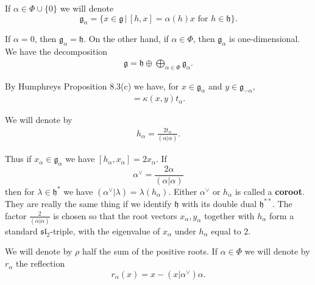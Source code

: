 \documentclass[12pt]{article}
\begin{document}
If $\alpha \in \Phi \cup \{0\}$ we will denote
\[
    \mathfrak{g}_\alpha = \{x \in \mathfrak{g} \,|\, [h,x] = \alpha(h)x \text{ for } h \in \mathfrak{h} \}.
\]

If $\alpha = 0$, then $\mathfrak{g}_\alpha = \mathfrak{h}$. On the other hand, if $\alpha \in \Phi$, then $\mathfrak{g}_\alpha$ is one-dimensional. We have the decomposition
\begin{align*}
    \mathfrak{g} = \mathfrak{h} \oplus \bigoplus_{\alpha \in \Phi} \mathfrak{g}_\alpha.
\end{align*}

By Humphreys Proposition 8.3(c) we have, for $x \in \mathfrak{g}_\alpha$ and $y \in \mathfrak{g}_{-\alpha}$,
\begin{align*}
    [x,y] = \kappa(x,y)t_\alpha.
\end{align*}

We will denote by
\begin{align*}
    h_\alpha = \frac{2t_\alpha}{(\alpha|\alpha)}.
\end{align*}

Thus if $x_\alpha \in \mathfrak{g}_\alpha$ we have $[h_\alpha, x_\alpha] = 2x_\alpha$. If
\[
    \alpha^\vee = \frac{2\alpha}{(\alpha|\alpha)}
\]
then for $\lambda \in \mathfrak{h}^*$ we have $(\alpha^\vee | \lambda) = \lambda(h_\alpha)$. Either $\alpha^\vee$ or $h_\alpha$ is called a \textbf{coroot}. They are really the same thing if we identify $\mathfrak{h}$ with its double dual $\mathfrak{h}^{**}$. The factor $\tfrac{2}{(\alpha|\alpha)}$ is chosen so that the root vectors $x_\alpha, y_\alpha$ together with $h_\alpha$ form a standard $\mathfrak{sl}_2$-triple, with the eigenvalue of $x_\alpha$ under $h_\alpha$ equal to $2$.

We will denote by $\rho$ half the sum of the positive roots. If $\alpha \in \Phi$ we will denote by $r_\alpha$ the reflection
\[
    r_\alpha(x) = x - (x|\alpha^\vee)\alpha.
\]
\end{document}
